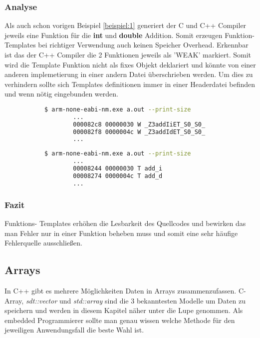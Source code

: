 \documentclass[MES,Master,ngerman]{twbook}%
\begin{document}
\subsubsection{Analyse}
Als auch schon vorigen Beispiel \ref{beispiel:1} generiert der C und C++ Compiler jeweils eine Funktion für die \textbf{int} und \textbf{double} Addition. Somit erzeugen Funktion- Templates bei richtiger Verwendung auch keinen Speicher Overhead. Erkennbar ist das der C++ Compiler die 2 Funktionen jeweils als 'WEAK' markiert. Somit wird die Template Funktion nicht als fixes Objekt deklariert und könnte von einer anderen implemetierung in einer andern Datei überschrieben werden. Um dies zu verhindern sollte sich Templates definitionen immer in einer Headerdatei befinden und wenn nötig eingebunden werden.
\begin{figure}[!htb]
	\begin{subfigure}[b]{0.5\textwidth}
		\begin{lstlisting}[gobble=6, title={Compiler Output C++}, language=bash, numbers=none]
		$ arm-none-eabi-nm.exe a.out --print-size
		...
		000082c8 00000030 W _Z3addIiET_S0_S0_
		000082f8 0000004c W _Z3addIdET_S0_S0_
		...
		\end{lstlisting}
	\end{subfigure}
	\begin{subfigure}[b]{0.5\textwidth}
		\begin{lstlisting}[gobble=6, title={Compiler Output C}, language=bash, numbers=none]
		$ arm-none-eabi-nm.exe a.out --print-size
		...
		00008244 00000030 T add_i
		00008274 0000004c T add_d
		...
		\end{lstlisting}
	\end{subfigure}
\end{figure}

\subsubsection{Fazit}
Funktions- Templates erhöhen die Lesbarkeit des Quellcodes und bewirken das man Fehler nur in einer Funktion beheben muss und somit eine sehr häufige Fehlerquelle ausschließen. 

\newpage

\subsection{Arrays}
In C++ gibt es mehrere Möglichkeiten Daten in Arrays zusammenzufassen. C- Array, \textit{sdt::vector} und \textit{std::array} sind die 3 bekanntesten Modelle um Daten zu speichern und werden in diesem Kapitel näher unter die Lupe genommen. Als embedded Programmierer sollte man genau wissen welche Methode für den jeweiligen Anwendungsfall die beste Wahl ist.
\end{document}
